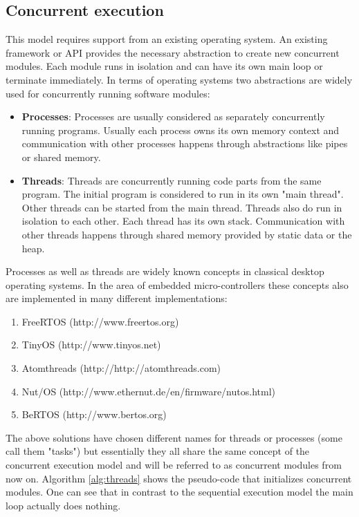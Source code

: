 \subsection{Concurrent execution}
This model requires support from an existing operating system. An existing framework or API provides the necessary abstraction to create new concurrent modules. Each module runs in isolation and can have its own main loop or terminate immediately. In terms of operating systems two abstractions are widely used for concurrently running software modules:

\begin{itemize}
\item \textbf{Processes}: Processes are usually considered as separately concurrently running programs. Usually each process owns its own memory context and communication with other processes happens through abstractions like pipes or shared memory.
\item \textbf{Threads}: Threads are concurrently running code parts from the same program. The initial program is considered to run in its own "main thread". Other threads can be started from the main thread. Threads also do run in isolation to each other. Each thread has its own stack. Communication with other threads happens through shared memory provided by static data or the heap.
\end{itemize}

Processes as well as threads are widely known concepts in classical desktop operating systems. In the area of embedded micro-controllers these concepts also are implemented in many different implementations:

\begin{enumerate}
\item FreeRTOS (http://www.freertos.org)
\item TinyOS (http://www.tinyos.net)
\item Atomthreads (http://http://atomthreads.com)
\item Nut/OS (http://www.ethernut.de/en/firmware/nutos.html)
\item BeRTOS (http://www.bertos.org)
\end{enumerate}

The above solutions have chosen different names for threads or processes (some call them "tasks") but essentially they all share the same concept of the concurrent execution model and will be referred to as concurrent modules from now on. Algorithm \ref{alg:threads} shows the pseudo-code that initializes concurrent modules. One can see that in contrast to the sequential execution model the main loop actually does nothing.

